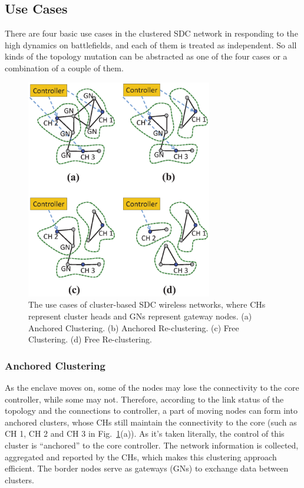 \documentclass[conference]{IEEEtran}
\begin{document}
\subsection{Use Cases}
There are four basic use cases in the clustered SDC network in responding to the high dynamics on battlefields, and each of them is treated as independent. So all kinds of the topology mutation can be abstracted as one of the four cases or a combination of a couple of them.
\begin{figure}
\centering
\includegraphics[width=3.2in]{usecase}
\caption{The use cases of cluster-based SDC wireless networks, where CHs represent cluster heads and GNs represent gateway nodes. (a) Anchored Clustering. (b) Anchored Re-clustering. (c) Free Clustering. (d) Free Re-clustering.}
\label{usecase}
\end{figure}
\subsubsection{Anchored Clustering}
As the enclave moves on, some of the nodes may lose the connectivity to the core controller, while some may not. Therefore, according to the link status of the topology and the connections to controller, a part of moving nodes can form into anchored clusters, whose CHs still maintain the connectivity to the core (such as CH 1, CH 2 and CH 3 in Fig.~\ref{usecase}(a)). As it's taken literally, the control of this cluster is ``anchored'' to the core controller. The network information is collected, aggregated and reported by the CHs, which makes this clustering approach efficient. The border nodes serve as gateways (GNs) to exchange data between clusters.
\end{document}
